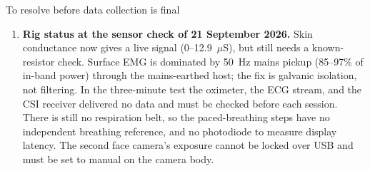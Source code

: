 \documentclass[11pt,a4paper]{article}
\begin{document}
\begin{notebox}{To resolve before data collection is final}
\begin{enumerate}[leftmargin=*]
    return-to-baseline gate before the word list and read-aloud. Lengthening the washouts to 60~s would add 2:40;
    a Part~3 gate about 30~s.
  \item \textbf{Rig status at the sensor check of 21 September 2026.} Skin conductance now gives a live signal
    (0--12.9~$\mu$S), but still needs a known-resistor check. Surface EMG is dominated by 50~Hz mains pickup (85--97\%
    of in-band power) through the mains-earthed host; the fix is galvanic isolation, not filtering. In the
    three-minute test the oximeter, the ECG stream, and the CSI receiver delivered no data and must be checked
    before each session. There is still no respiration belt, so the paced-breathing steps have no independent
    breathing reference, and no photodiode to measure display latency. The second face camera's exposure cannot
    be locked over USB and must be set to manual on the camera body.
\end{enumerate}
\end{notebox}
\end{document}
